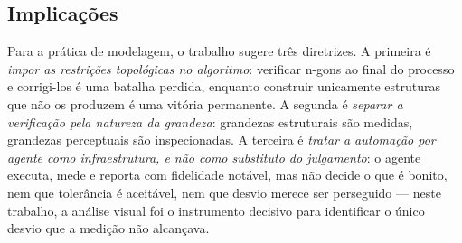 \subsection{Implica\c{c}\~oes}

Para a pr\'atica de modelagem, o trabalho sugere tr\^es diretrizes. A primeira \'e
\emph{impor as restri\c{c}\~oes topol\'ogicas no algoritmo}: verificar n-gons ao final do
processo e corrigi-los \'e uma batalha perdida, enquanto construir unicamente estruturas
que n\~ao os produzem \'e uma vit\'oria permanente. A segunda \'e \emph{separar a
verifica\c{c}\~ao pela natureza da grandeza}: grandezas estruturais s\~ao medidas,
grandezas perceptuais s\~ao inspecionadas. A terceira \'e \emph{tratar a
automa\c{c}\~ao por agente como infraestrutura, e n\~ao como substituto do
julgamento}: o agente executa, mede e reporta com fidelidade not\'avel, mas n\~ao decide o
que \'e bonito, nem que toler\^ancia \'e aceit\'avel, nem que desvio merece ser
perseguido --- neste trabalho, a an\'alise visual foi o instrumento decisivo para
identificar o \'unico desvio que a medi\c{c}\~ao n\~ao alcan\c{c}ava.
